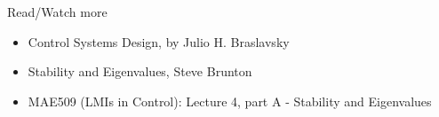 \documentclass{beamer}
\begin{document}
\begin{frame}{Read/Watch more}

\begin{itemize}
\item Control Systems Design, by Julio H. Braslavsky 

\item Stability and Eigenvalues, Steve Brunton 

\item MAE509 (LMIs in Control): Lecture 4, part A - Stability and Eigenvalues  

\end{itemize}

\end{frame}



\myqrframe
\end{document}
